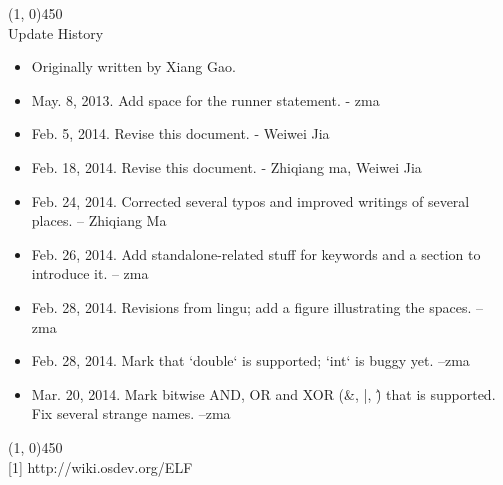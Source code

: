 \documentclass[a4paper]{article}
\begin{document}
\line(1, 0){450}\\

Update History\\
\begin{itemize}
	\item Originally written by Xiang Gao.
	\item May. 8, 2013. Add space for the runner statement. - zma
	\item Feb. 5, 2014. Revise this document. - Weiwei Jia
	\item Feb. 18, 2014. Revise this document. - Zhiqiang ma, Weiwei Jia
	\item Feb. 24, 2014. Corrected several typos and improved writings of several places. – Zhiqiang Ma
	\item Feb. 26, 2014. Add standalone-related stuff for keywords and a section to introduce it. – zma
	\item Feb. 28, 2014. Revisions from lingu; add a figure illustrating the spaces. – zma
	\item Feb. 28, 2014. Mark that `double` is supported; `int` is buggy yet. –zma
	\item Mar. 20, 2014. Mark bitwise AND, OR and XOR (\&, |, \^) that is supported. Fix several strange names. –zma
\end{itemize}

\line(1, 0){450}\\

[1] http://wiki.osdev.org/ELF
\end{document}
